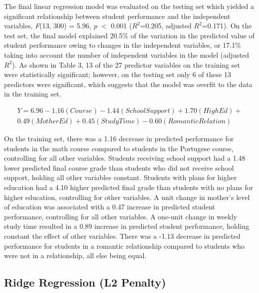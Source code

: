 \documentclass[sigconf]{acmart}
\begin{document}
The final linear regression model was evaluated on the testing set which
yielded a significant relationship between student performance and the 
independent variables, \textit{F}(13, 300) = 5.96, \textit{p} $<$ 0.001
($R^2$=0.205, adjusted $R^2$=0.171). On the test set, the final model explained 
20.5\% of the variation in the predicted value of student performance owing 
to changes in the independent variables, or 17.1\% taking into account the 
number of independent variables in the model (adjusted $R^2$). As shown in 
Table 3, 13 of the 27 predictor variables on the training set were 
statistically significant; however, on the testing set only 6 of these 13 
predictors were significant, which suggests that the model was overfit to 
the data in the training set. 


\begin{equation*}
 \begin{aligned}
  Y = 6.96 - 1.16(Course) - 1.44(SchoolSupport) + 1.70(HighEd) + \\
  0.49(MotherEd) + 0.45(StudyTime) - 0.60(RomanticRelation)
 \end{aligned}
\end{equation*}

On the training set, there was a 1.16 decrease in predicted performance 
for students in the math course compared to students in the Portugese course, 
controlling for all other variables. Students receiving school support had 
a 1.48 lower predicted final course grade than students who did not receive 
school support, holding all other variables constant. Students with plans for
higher education had a 4.10 higher predicted final grade than students with 
no plans for higher education, controlling for other variables. A unit change 
in mother's level of education was associated with a 0.47 increase in predicted 
student performance, controlling for all other variables. A one-unit change in 
weekly study time resulted in a 0.89 increase in predicted student performance, 
holding constant the effect of other variables. There was a -1.13 decrease in 
predicted performance for students in a romantic relationship compared to 
students who were not in a relationship, all else being equal. 


\subsection{Ridge Regression (L2 Penalty)}
\end{document}
